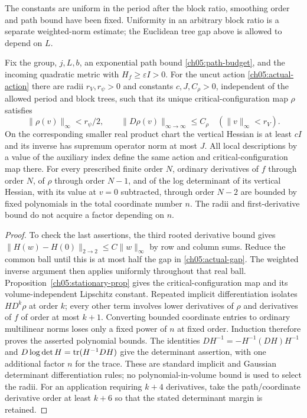 The constants are uniform in the period after the block ratio,
smoothing order and path bound have been fixed. Uniformity in
an arbitrary block ratio is a separate weighted-norm estimate;
the Euclidean tree gap above is allowed to depend on $L$.

\begin{proposition}
\label{ch05:actual-stationary}
Fix the group, $j,L,b$, an exponential path bound
\eqref{ch05:path-budget}, and the incoming quadratic metric with
$H_f\ge\varepsilon I>0$. For the uncut action
\eqref{ch05:actual-action} there are radii $r_V,r_\psi>0$ and constants
$c,J,C_\rho>0$, independent of the allowed period and block trees, such
that its unique critical-configuration map $\rho$ satisfies
\[
 \|\rho(v)\|_\infty<r_\psi/2,
 \qquad \|D\rho(v)\|_{\infty\to\infty}\le C_\rho
 \quad(\|v\|_\infty<r_V).
\]
On the corresponding smaller real product chart the vertical Hessian is
at least $cI$ and its inverse has supremum operator norm at most $J$.
All local descriptions by a value of the auxiliary index define the same action and critical-configuration map
there. For every prescribed finite order $N$, ordinary derivatives of
$f$ through order $N$, of $\rho$ through order $N-1$, and of the
log determinant of its vertical Hessian, with its value at $v=0$ subtracted, through order $N-2$ are bounded
by fixed polynomials in the total coordinate number $n$. The radii and
first-derivative bound do not acquire a factor depending on $n$.
\end{proposition}

\begin{proof}
To check the last assertions, the third rooted derivative bound gives
$\|H(w)-H(0)\|_{2\to2}\le C\|w\|_\infty$ by row and column sums.
Reduce the common ball until this is at most half the gap in
\eqref{ch05:actual-gap}. The weighted inverse argument then applies
uniformly throughout that real ball. Proposition~\ref{ch05:stationary-prop}
gives the critical-configuration map and its volume-independent Lipschitz constant. Repeated
implicit differentiation isolates $H D^k\rho$ at order $k$; every other
term involves lower derivatives of $\rho$ and derivatives of $f$ of order
at most $k+1$. Converting bounded coordinate entries to ordinary
multilinear norms loses only a fixed power of $n$ at fixed order. Induction
therefore proves the asserted polynomial bounds. The identities
$D H^{-1}=-H^{-1}(DH)H^{-1}$ and
$D\log\det H=\operatorname{tr}(H^{-1}DH)$ give the determinant assertion, with one
additional factor $n$ for the trace. These are standard implicit and
Gaussian determinant differentiation rules; no polynomial-in-volume
bound is used to select the radii. For an application requiring $k+4$
derivatives, take the path/coordinate derivative order at least $k+6$
so that the stated determinant margin is retained.
\end{proof}

